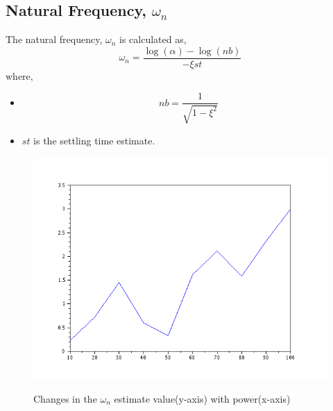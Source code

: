 \subsection{Natural Frequency, $\omega _n$}
\label{sec:natFreq}
The natural frequency, $\omega _n$ is calculated as,
\begin{equation}
 \omega _n = \frac{\log (\alpha ) - \log (nb)}{-\xi st}
\end{equation}
where,
\begin{itemize}
	\item
     \begin{equation} 
		nb = \frac{1}{\sqrt{1 - \xi ^2}} 
	 \end{equation}
	\item $st$ is the settling time estimate.
\end{itemize}

\begin{figure}[H]
\centering
	\includegraphics[scale=0.5]{images/_power_vs_omega.png} \\
    \caption{Changes in the $\omega _n$ estimate value(y-axis) with power(x-axis)}
\end{figure}

